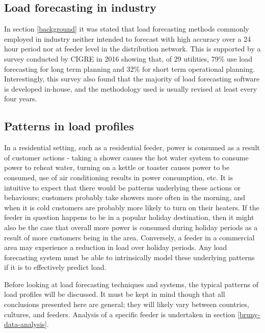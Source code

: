 \subsection{Load forecasting in industry}
In section \ref{background} it was stated that load forecasting methods commonly employed in industry neither intended to forecast with high accuracy over a 24 hour period nor at feeder level in the distribution network.
This is supported by a survey conducted by CIGRE in 2016 \citep{CIGRE2016} showing that, of 29 utilities, 79\% use load forecasting for long term planning and 32\% for short term operational planning.
Interestingly, this survey also found that the majority of load forecasting software is developed in-house, and the methodology used is usually revised at least every four years.


\subsection{Patterns in load profiles}
\label{patterns-profiles}
In a residential setting, such as a residential feeder, power is consumed as a result of customer actions - taking a shower causes the hot water system to consume power to reheat water, turning on a kettle or toaster causes power to be consumed, use of air conditioning results in power consumption, etc.
It is intuitive to expect that there would be patterns underlying these actions or behaviours; customers probably take showers more often in the morning, and when it is cold customers are probably more likely to turn on their heaters.
If the feeder in question happens to be in a popular holiday destination, then it might also be the case that overall more power is consumed during holiday periods as a result of more customers being in the area.
Conversely, a feeder in a commercial area may experience a reduction in load over holiday periods.
Any load forecasting system must be able to intrinsically model these underlying patterns if it is to effectively predict load.
\par
Before looking at load forecasting techniques and systems, the typical patterns of load profiles will be discussed.
It must be kept in mind though that all conclusions presented here are general; they will likely vary between countries, cultures, and feeders.
Analysis of a specific feeder is undertaken in section \ref{bruny-data-analysis}.

